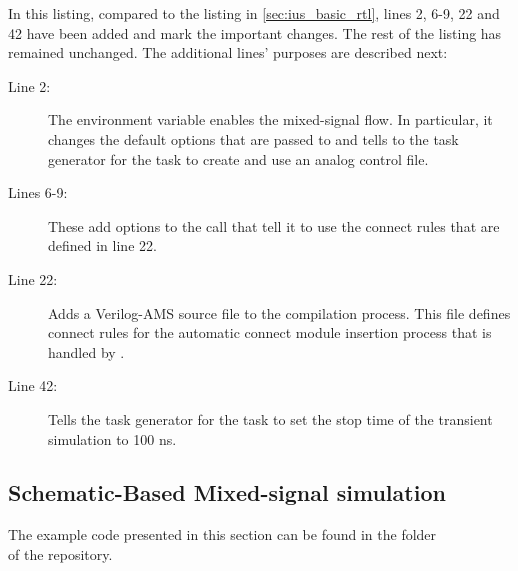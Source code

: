 In this listing, compared to the listing in \cref{sec:ius_basic_rtl}, lines 2,
6-9, 22 and 42 have been added and mark the important changes. The rest of the
listing has remained unchanged. The additional lines' purposes are described
next:
\begin{description}
    \item[Line 2:] The environment variable  enables the
 mixed-signal flow. In particular, it changes the default options that are
 passed to  and tells to the task generator for the  task
 to create and use an analog control file.
    \item[Lines 6-9:] These add options to the  call that tell it to
 use the connect rules that are defined in line 22.
    \item[Line 22:] Adds a Verilog-AMS source file to the compilation process.
 This file defines connect rules for the automatic connect module insertion
 process that is handled by .
    \item[Line 42:] Tells the task generator for the  task to set the
 stop time of the transient simulation to 100 ns.
\end{description}

\clearpage
\subsection{Schematic-Based Mixed-signal simulation}
\label{sec:ius_schematic_rtl}

The example code presented in this section can be found in the folder\\
 of the repository.


